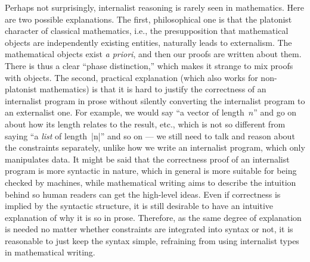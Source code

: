 Perhaps not surprisingly, internalist reasoning is rarely seen in mathematics.
Here are two possible explanations.
The first, philosophical one is that the platonist character of classical mathematics, i.e., the presupposition that mathematical objects are independently existing entities, naturally leads to externalism.
The mathematical objects exist \textit{a priori}, and then our proofs are written about them.
There is thus a clear ``phase distinction,'' which makes it strange to mix proofs with objects.
The second, practical explanation (which also works for non-platonist mathematics) is that it is hard to justify the correctness of an internalist program in prose without silently converting the internalist program to an externalist one.
For example, we would say ``a vector of length~$n$'' and go on about how its length relates to the result, etc., which is not so different from saying ``a \emph{list} of length~|n|'' and so on --- we still need to talk and reason about the constraints separately, unlike how we write an internalist program, which only manipulates data.
It might be said that the correctness proof of an internalist program is more syntactic in nature, which in general is more suitable for being checked by machines, while mathematical writing aims to describe the intuition behind so human readers can get the high-level ideas.
Even if correctness is implied by the syntactic structure, it is still desirable to have an intuitive explanation of why it is so in prose.
Therefore, as the same degree of explanation is needed no matter whether constraints are integrated into syntax or not, it is reasonable to just keep the syntax simple, refraining from using internalist types in mathematical writing.

